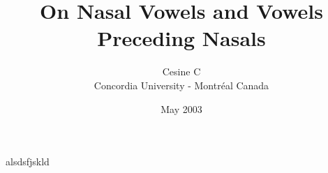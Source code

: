 \documentclass{article}
\begin{document}
\title{On Nasal Vowels and Vowels Preceding Nasals}
\author{Cesine C\\Concordia University - Montr\'{e}al Canada}
\date{May 2003}
\maketitle

alsdsfjskld
\end{document}
